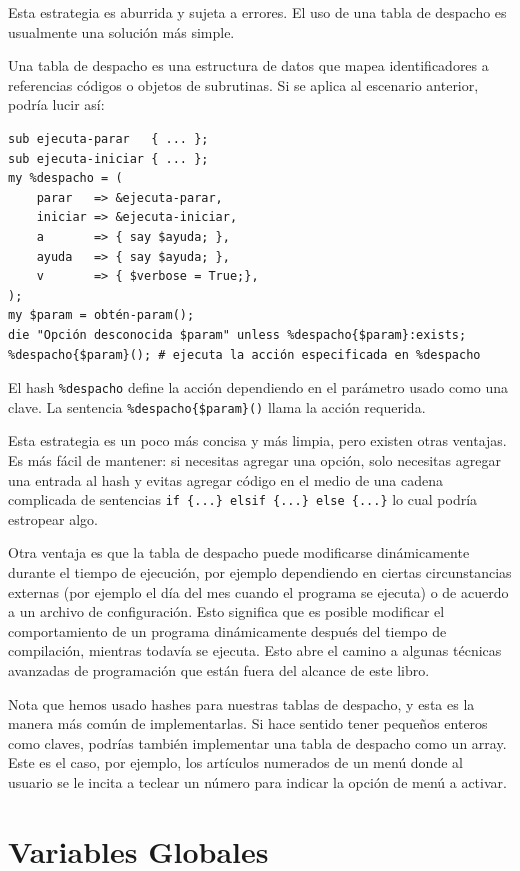 Esta estrategia es aburrida y sujeta a errores. El uso de 
una tabla de despacho es usualmente una solución más simple.

Una tabla de despacho es una estructura de datos que mapea 
identificadores a referencias códigos o objetos de subrutinas.
Si se aplica al escenario anterior, podría lucir así:

\begin{lstlisting}
sub ejecuta-parar   { ... };
sub ejecuta-iniciar { ... };
my %despacho = (
    parar   => &ejecuta-parar,
    iniciar => &ejecuta-iniciar,
    a       => { say $ayuda; },
    ayuda   => { say $ayuda; },
    v       => { $verbose = True;},
);
my $param = obtén-param();
die "Opción desconocida $param" unless %despacho{$param}:exists;
%despacho{$param}(); # ejecuta la acción especificada en %despacho
\end{lstlisting}

El hash \verb|%despacho| define la acción dependiendo en el 
parámetro usado como una clave. La sentencia \verb|%despacho{$param}()|
llama la acción requerida.

Esta estrategia es un poco más concisa y más limpia, pero existen 
otras ventajas. Es más fácil de mantener: si necesitas agregar
una opción, solo necesitas agregar una entrada al hash y evitas
agregar código en el medio de una cadena complicada de sentencias
\verb'if {...} elsif {...} else {...}' lo cual podría estropear algo.

Otra ventaja es que la tabla de despacho puede modificarse
dinámicamente durante el tiempo de ejecución, por ejemplo 
dependiendo en ciertas circunstancias externas (por ejemplo el día
del mes cuando el programa se ejecuta) o de acuerdo a un 
archivo de configuración. Esto significa que es posible 
modificar el comportamiento de un programa dinámicamente 
después del tiempo de compilación, mientras todavía se
ejecuta. Esto abre el camino a algunas técnicas avanzadas de
programación que están fuera del alcance de este libro.

Nota que hemos usado hashes para nuestras tablas de despacho,
y esta es la manera más común de implementarlas. Si hace sentido
tener pequeños enteros como claves, podrías también implementar
una tabla de despacho como un array. Este es el caso, por ejemplo,
los artículos numerados de un menú donde al usuario se le incita
a teclear un número para indicar la opción de menú a activar.


\section{Variables Globales}

